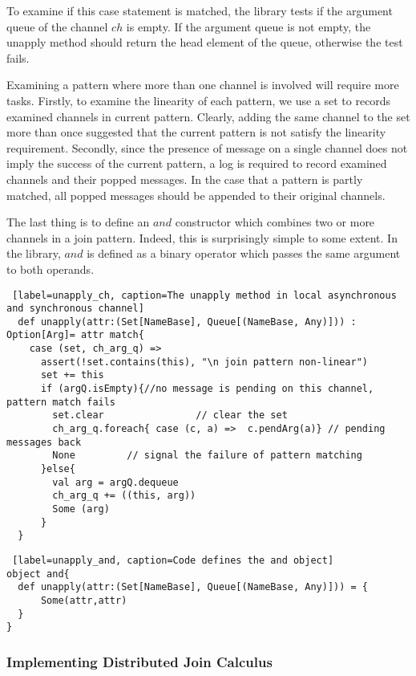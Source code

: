 To examine if this case statement is matched, the library tests if the argument queue of the channel $ch$ is empty.  If the argument queue is not empty, the unapply method should return the head element of the queue, otherwise the test fails.

Examining a pattern where more than one channel is involved will require more tasks.  Firstly, to examine the linearity of each pattern, we use a set to records examined channels in current pattern.  Clearly, adding the same channel to the set more than once suggested that the current pattern is not satisfy the linearity requirement.  Secondly, since the presence of message on a single channel does not imply the success of the current pattern, a log is required to record examined channels and their popped messages.  In the case that a pattern is partly matched, all popped  messages should be appended to their original channels.

The last thing is to define an $and$ constructor which combines two or more channels in a join pattern.  Indeed, this is surprisingly simple to some extent.  In the library, $and$ is defined as a binary operator which passes the same argument to both operands.

\begin{lstlisting} [label=unapply_ch, caption=The unapply method in local asynchronous and synchronous channel]
  def unapply(attr:(Set[NameBase], Queue[(NameBase, Any)])) : Option[Arg]= attr match{
    case (set, ch_arg_q) =>
      assert(!set.contains(this), "\n join pattern non-linear")
      set += this
      if (argQ.isEmpty){//no message is pending on this channel, pattern match fails
        set.clear                // clear the set
        ch_arg_q.foreach{ case (c, a) =>  c.pendArg(a)} // pending messages back
        None         // signal the failure of pattern matching 
      }else{
        val arg = argQ.dequeue 
        ch_arg_q += ((this, arg))
        Some (arg)
      }
  }
\end{lstlisting}

\begin{lstlisting} [label=unapply_and, caption=Code defines the and object]
object and{
  def unapply(attr:(Set[NameBase], Queue[(NameBase, Any)])) = {
      Some(attr,attr)
  }
}
\end{lstlisting}

\subsubsection{Implementing Distributed Join Calculus}
\label{imp_dis_join}

